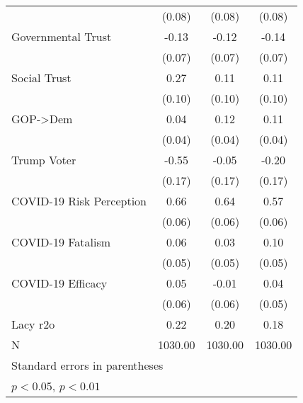 \begin{table}[htbp]
\begin{tabular}{l*{3}{c}}
                    &      (0.08)        &      (0.08)        &      (0.08)        \\
[1em]
Governmental Trust  &       -0.13        &       -0.12        &       -0.14\sym{*} \\
                    &      (0.07)        &      (0.07)        &      (0.07)        \\
[1em]
Social Trust        &        0.27\sym{**}&        0.11        &        0.11        \\
                    &      (0.10)        &      (0.10)        &      (0.10)        \\
[1em]
GOP->Dem            &        0.04        &        0.12\sym{**}&        0.11\sym{**}\\
                    &      (0.04)        &      (0.04)        &      (0.04)        \\
[1em]
Trump Voter         &       -0.55\sym{**}&       -0.05        &       -0.20        \\
                    &      (0.17)        &      (0.17)        &      (0.17)        \\
[1em]
COVID-19 Risk Perception&        0.66\sym{**}&        0.64\sym{**}&        0.57\sym{**}\\
                    &      (0.06)        &      (0.06)        &      (0.06)        \\
[1em]
COVID-19 Fatalism   &        0.06        &        0.03        &        0.10        \\
                    &      (0.05)        &      (0.05)        &      (0.05)        \\
[1em]
COVID-19 Efficacy   &        0.05        &       -0.01        &        0.04        \\
                    &      (0.06)        &      (0.06)        &      (0.05)        \\
\hline
Lacy r2o            &        0.22        &        0.20        &        0.18        \\
N                   &     1030.00        &     1030.00        &     1030.00        \\
\hline\hline
\multicolumn{4}{l}{\footnotesize Standard errors in parentheses}\\
\multicolumn{4}{l}{\footnotesize \sym{*} \(p<0.05\), \sym{**} \(p<0.01\)}\\
\end{tabular}
\end{table}
